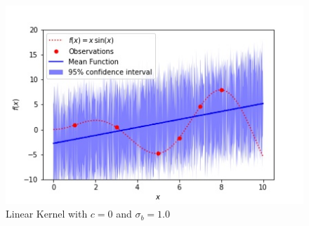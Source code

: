 \documentclass{article}
\begin{document}
\begin{figure}
\centering
  \includegraphics[scale=0.6]{Lin.jpg}
  \caption{Linear Kernel with $c = 0$ and $\sigma_{b} = 1.0$}
  \label{fig:Lin}
\end{figure}

%
%
\end{document}

